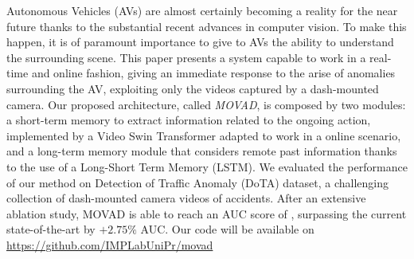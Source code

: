 Autonomous Vehicles (AVs) are almost certainly becoming a reality for the near future thanks to the substantial recent advances in computer vision.
To make this happen, it is of paramount importance to give to AVs the ability to understand the surrounding scene.
This paper presents a system capable to work in a real-time and online fashion, giving an immediate response to the arise of anomalies surrounding the AV, exploiting only the videos captured by a dash-mounted camera.
Our proposed architecture, called \emph{MOVAD}, is composed by two modules: a short-term memory to extract information related to the ongoing action, implemented by a Video Swin Transformer adapted to work in a online scenario, and a long-term memory module that considers remote past information thanks to the use of a Long-Short Term Memory (LSTM).
We evaluated the performance of our method on Detection of Traffic Anomaly (DoTA) dataset, a challenging collection of dash-mounted camera videos of accidents.
After an extensive ablation study, MOVAD is able to reach an AUC score of , surpassing the current state-of-the-art by $+2.75\%$ AUC.
Our code will be available on \url{https://github.com/IMPLabUniPr/movad}